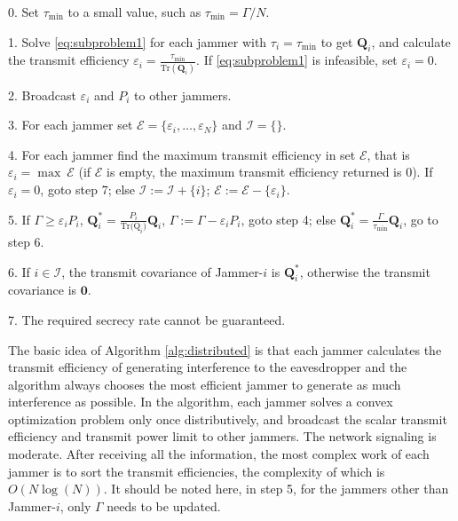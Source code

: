 \documentclass[12pt, journal,onecolumn,draftclsnofoot]{IEEEtran}
\begin{document}
\begin{algorithm}
	\caption{}\label{alg:distributed}
	\begin{algorithmic}
		\item[0.] Set $\tau_{\mathrm{min}}$ to a small value, such as $\tau_{\mathrm{min}} = \Gamma/N$. 
		\item[1.] Solve \eqref{eq:subproblem1} for each jammer with $\tau_i = \tau_{\mathrm{min}}$ to get $\mathbf{Q}_i$, and calculate the transmit efficiency $\varepsilon_i = \frac{\tau_{\mathrm{min}}}{\mathrm{Tr}(\mathbf{Q}_i)}$. If \eqref{eq:subproblem1} is infeasible, set $\varepsilon_i = 0$.
		\item[2.] Broadcast $\varepsilon_i$ and $P_i$ to other jammers. 
		\item[3.] For each jammer set $\mathcal{E} =\{ {\varepsilon_i,\ldots, \varepsilon_N}\}$ and $\mathcal{I} =\{\}$.
		\item[4.] For each jammer find the maximum transmit efficiency in set $\mathcal{E}$, that is $\varepsilon_i = \max~\mathcal{E}$ (if $\mathcal{E}$ is empty,  the maximum transmit efficiency returned is 0). If $\varepsilon_i = 0$, goto step 7; else $\mathcal{I} := \mathcal{I} + \{i\}$; $\mathcal{E} := \mathcal{E}  - \{\varepsilon_i\}$.
		\item[5.] If $\Gamma \geq \varepsilon_{i} P_i$, $\mathbf{Q}_{i}^* = \frac{P_i}{\mathrm{Tr(\mathrm{Q}}_i)}\mathbf{Q}_i$, $\Gamma := \Gamma - \varepsilon_iP_i$, goto step 4; else $\mathbf{Q}_{i}^* = \frac{\Gamma}{\tau_\mathrm{min}}\mathbf{Q}_i$, go to step 6.
		\item[6.] If $i \in \mathcal{I}$, the transmit covariance of Jammer-$i$ is $\mathbf{Q}_i^*$, otherwise the transmit covariance is $\mathbf{0}$.
		\item[7.] The required secrecy rate cannot be guaranteed.
	\end{algorithmic}
\end{algorithm}

The basic idea of Algorithm \ref{alg:distributed} is that each jammer calculates the transmit efficiency of generating interference to the eavesdropper and the algorithm always chooses the most efficient jammer to generate as much interference as possible. In the algorithm, each jammer solves a convex optimization problem only once distributively, and broadcast the scalar transmit efficiency and transmit power limit to other jammers. The network signaling is moderate. After receiving all the information, the most complex work of each jammer is to sort the transmit efficiencies, the complexity of which is $O(N\log(N))$. It should be noted here, in step 5, for the jammers other than Jammer-$i$, only $\Gamma$ needs to be updated.
\end{document}
